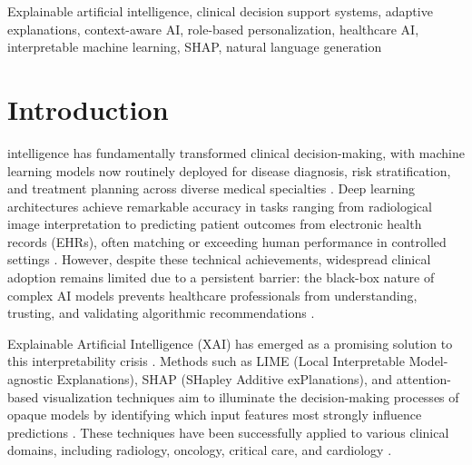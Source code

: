 \documentclass{ieeeaccess}
\begin{document}
\begin{keywords}
Explainable artificial intelligence, clinical decision support systems, adaptive explanations, context-aware AI, role-based personalization, healthcare AI, interpretable machine learning, SHAP, natural language generation
\end{keywords}

\titlepgskip=-21pt

\maketitle


\section{Introduction}
\label{sec:introduction}

 intelligence has fundamentally transformed clinical decision-making, with machine learning models now routinely deployed for disease diagnosis, risk stratification, and treatment planning across diverse medical specialties \cite{web3, web4}. Deep learning architectures achieve remarkable accuracy in tasks ranging from radiological image interpretation to predicting patient outcomes from electronic health records (EHRs), often matching or exceeding human performance in controlled settings \cite{web6, web8}. However, despite these technical achievements, widespread clinical adoption remains limited due to a persistent barrier: the black-box nature of complex AI models prevents healthcare professionals from understanding, trusting, and validating algorithmic recommendations \cite{web3, web5}.

Explainable Artificial Intelligence (XAI) has emerged as a promising solution to this interpretability crisis \cite{web3, web6}. Methods such as LIME (Local Interpretable Model-agnostic Explanations), SHAP (SHapley Additive exPlanations), and attention-based visualization techniques aim to illuminate the decision-making processes of opaque models by identifying which input features most strongly influence predictions \cite{web13, web15, web16}. These techniques have been successfully applied to various clinical domains, including radiology, oncology, critical care, and cardiology \cite{web3, web9}.
\end{document}
